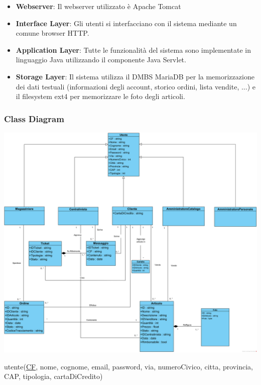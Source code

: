 \documentclass[12pt,a4paper]{article}
\begin{document}
\begin{itemize}
\item \textbf{Webserver}: Il webserver utilizzato è Apache Tomcat %
\item \textbf{Interface Layer}: Gli utenti si interfacciano con il sistema mediante un comune browser HTTP.
\item \textbf{Application Layer}: Tutte le funzionalità del sistema sono implementate in linguaggio Java utilizzando il componente Java Servlet.
\item \textbf{Storage Layer}: Il sistema utilizza il DMBS MariaDB per la memorizzazione dei dati testuali (informazioni degli account, storico ordini, lista vendite, ...) e il filesystem ext4 per memorizzare le foto degli articoli.
\end{itemize}

\newpage

\subsubsection{Class Diagram}
\begin{center}
\includegraphics[width=\textwidth]{../../RAD/img/diagrammadiclasse} \\
\end{center}

\noindent
utente(\underline{CF}, nome, cognome, email, password, via, numeroCivico, citta, provincia, CAP, tipologia, cartaDiCredito)
\end{document}

